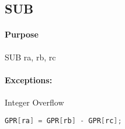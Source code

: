 \subsection{SUB}


\paragraph{Purpose} SUB ra, rb, rc

\paragraph{Exceptions:} Integer Overflow

\begin{lstlisting}[language=C]
    GPR[ra] = GPR[rb] - GPR[rc];
\end{lstlisting}